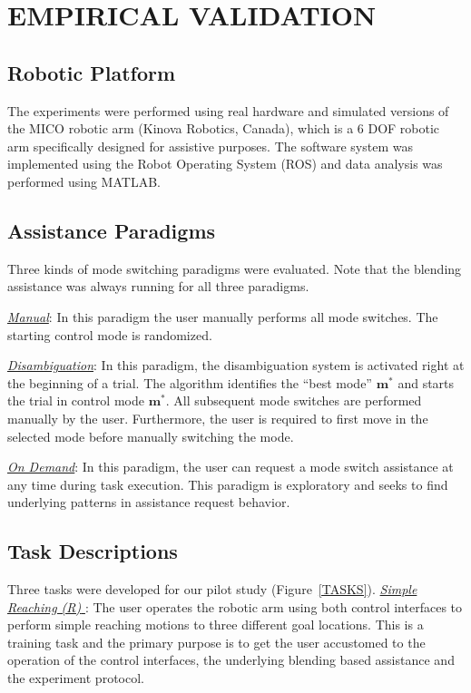 \documentclass[conference]{IEEEtran}
\begin{document}
\section{EMPIRICAL VALIDATION} \label{EV}
\subsection{Robotic Platform}

The experiments were performed using real hardware and simulated versions of the MICO robotic arm (Kinova Robotics, Canada), which is a 6 DOF robotic arm specifically designed for assistive purposes. The software system was implemented using the Robot Operating System (ROS) and data analysis was performed using MATLAB. 
\subsection{Assistance Paradigms}
Three kinds of mode switching paradigms were evaluated. Note that the blending assistance was always running for all three paradigms.

\noindent\underline{\textit{Manual}}: In this paradigm the user manually performs all mode switches. The starting control mode is randomized. 

\noindent\underline{\textit{Disambiguation}}: In this paradigm, the disambiguation system is activated right at the beginning of a trial. The algorithm identifies the ``best mode'' $\boldsymbol{m}^*$ and starts the trial in control mode $\boldsymbol{m}^*$. All subsequent mode switches are performed manually by the user. Furthermore, the user is required to first move in the selected mode before manually switching the mode. 

\noindent\underline{\textit{On Demand}}: In this paradigm, the user can request a mode switch assistance at any time during task execution. This paradigm is exploratory and seeks to find underlying patterns in assistance request behavior.

\subsection{Task Descriptions}
Three tasks were developed for our pilot study (Figure~\ref{TASKS}).
\noindent\underline{\textit{Simple Reaching (R)} }: The user operates the robotic arm using both control interfaces to perform simple reaching motions to three different goal locations. This is a training task and the primary purpose is to get the user accustomed to the operation of the control interfaces, the underlying blending based assistance and the experiment protocol. 
\end{document}
